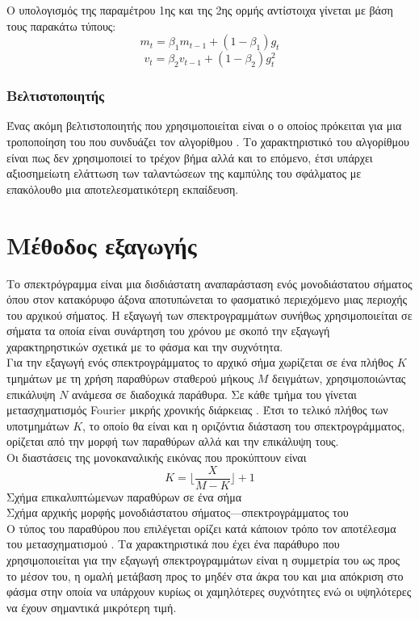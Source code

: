 Ο υπολογισμός της παραμέτρου 1ης και της 2ης ορμής αντίστοιχα γίνεται με βάση τους παρακάτω τύπους:
$$m_t=\beta_1m_{t-1}+\left(1-\beta_1\right)g_t$$
$$v_t=\beta_2v_{t-1}+\left(1-\beta_2\right)g_t^2$$

\subsubsection{Βελτιστοποιητής }
Ένας ακόμη βελτιστοποιητής που χρησιμοποιείται είναι ο  ο οποίος πρόκειται για μια τροποποίηση του  που συνδυάζει τον αλγορίθμου . Το χαρακτηριστικό του αλγορίθμου  είναι πως δεν χρησιμοποιεί το τρέχον βήμα αλλά και το επόμενο, έτσι υπάρχει αξιοσημείωτη ελάττωση των ταλαντώσεων της καμπύλης του σφάλματος με επακόλουθο μια αποτελεσματικότερη εκπαίδευση.\\

\section{Μέθοδος εξαγωγής }
Το σπεκτρόγραμμα είναι μια δισδιάστατη αναπαράσταση ενός μονοδιάστατου σήματος όπου στον κατακόρυφο άξονα αποτυπώνεται το φασματικό περιεχόμενο μιας περιοχής του αρχικού σήματος. Η εξαγωγή των σπεκτρογραμμάτων συνήθως χρησιμοποιείται σε σήματα τα οποία είναι συνάρτηση του χρόνου με σκοπό την εξαγωγή χαρακτηρηστικών σχετικά με το φάσμα και την συχνότητα.\\
Για την εξαγωγή ενός σπεκτρογράμματος το αρχικό σήμα χωρίζεται σε ένα πλήθος $K$ τμημάτων με τη χρήση παραθύρων σταθερού μήκους $M$ δειγμάτων, χρησιμοποιώντας επικάλυψη $N$ ανάμεσα σε διαδοχικά παράθυρα. Σε κάθε τμήμα του γίνεται μετασχηματισμός Fourier μικρής χρονικής διάρκειας . Έτσι το τελικό πλήθος των υποτμημάτων $K$, το οποίο θα είναι και η οριζόντια διάσταση του σπεκτρογράμματος, ορίζεται από την μορφή των παραθύρων αλλά και την επικάλυψη τους.\\
Οι διαστάσεις της μονοκαναλικής εικόνας που προκύπτουν είναι 
$$K=\lfloor\frac{X}{M-K}\rfloor+1$$
Σχήμα επικαλυπτώμενων παραθύρων σε ένα σήμα\\

Σχήμα αρχικής μορφής μονοδιάστατου σήματος---σπεκτρογράμματος του\\

Ο τύπος του παραθύρου που επιλέγεται ορίζει κατά κάποιον τρόπο τον αποτέλεσμα του μετασχηματισμού . Τα χαρακτηριστικά που έχει ένα παράθυρο που χρησιμοποιείται για την εξαγωγή σπεκτρογραμμάτων είναι η συμμετρία του ως προς το μέσον του, η ομαλή μετάβαση προς το μηδέν στα άκρα του και μια απόκριση στο φάσμα στην οποία να υπάρχουν κυρίως οι χαμηλότερες συχνότητες ενώ οι υψηλότερες να έχουν σημαντικά μικρότερη τιμή.

